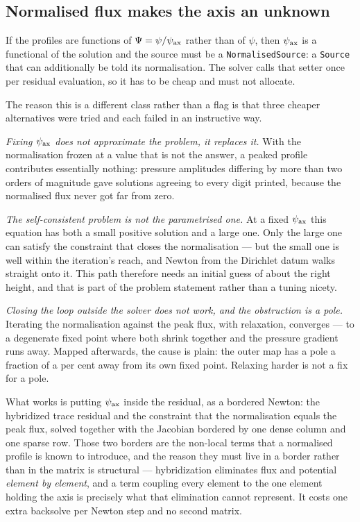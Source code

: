 \subsection{Normalised flux makes the axis an unknown}
\label{sec:normalised}

If the profiles are functions of $\Psi = \psi/\psi_{\mathrm{ax}}$ rather than of $\psi$, then
$\psi_{\mathrm{ax}}$ is a functional of the solution and the source must be a
\texttt{NormalisedSource}: a \texttt{Source} that can additionally be told its
normalisation. The solver calls that setter once per residual evaluation, so it
has to be cheap and must not allocate.

The reason this is a different class rather than a flag is that three cheaper
alternatives were tried and each failed in an instructive way.

\emph{Fixing $\psi_{\mathrm{ax}}$ does not approximate the problem, it replaces it.} With the
normalisation frozen at a value that is not the answer, a peaked profile
contributes essentially nothing: pressure amplitudes differing by more than two
orders of magnitude gave solutions agreeing to every digit printed, because the
normalised flux never got far from zero.

\emph{The self-consistent problem is not the parametrised one.} At a fixed
$\psi_{\mathrm{ax}}$ this equation has both a small positive solution and a large one. Only
the large one can satisfy the constraint that closes the normalisation --- but
the small one is well within the iteration's reach, and Newton from the Dirichlet
datum walks straight onto it. This path therefore needs an initial guess of about
the right height, and that is part of the problem statement rather than a
tuning nicety.

\emph{Closing the loop outside the solver does not work, and the obstruction is a
pole.} Iterating the normalisation against the peak flux, with relaxation,
converges --- to a degenerate fixed point where both shrink together and the
pressure gradient runs away. Mapped afterwards, the cause is plain: the outer map
has a pole a fraction of a per cent away from its own fixed point. Relaxing
harder is not a fix for a pole.

What works is putting $\psi_{\mathrm{ax}}$ inside the residual, as a bordered Newton: the
hybridized trace residual and the constraint that the normalisation equals the
peak flux, solved together with the Jacobian bordered by one dense column and one
sparse row. Those two borders are the non-local terms that a normalised profile
is known to introduce, and the reason they must live in a border rather than in
the matrix is structural --- hybridization eliminates flux and potential
\emph{element by element}, and a term coupling every element to the one element
holding the axis is precisely what that elimination cannot represent. It costs
one extra backsolve per Newton step and no second matrix.

